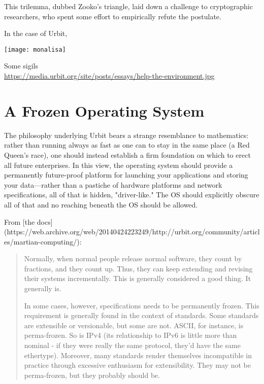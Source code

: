{{{This trilemma, dubbed Zooko's triangle, laid down a challenge to cryptographic researchers, who spent some effort to empirically refute the postulate.

In the case of Urbit,



\begin{marginfigure}[-5.5cm]
	\texttt{[image: monalisa]}
	\caption[Sigils]{Some sigils\\
	\url{https://media.urbit.org/site/posts/essays/help-the-environment.jpg}}
\end{marginfigure}

\section{A Frozen Operating System}

The philosophy underlying Urbit bears a strange resemblance to mathematics:  rather than running always as fast as one can to stay in the same place (a Red Queen's race), one should instead establish a firm foundation on which to erect all future enterprises.  In this view, the operating system should provide a permanently future-proof platform for launching your applications and storing your data—rather than a pastiche of hardware platforms and network specifications, all of that is hidden, "driver-like."  The OS should explicitly obscure all of that and no reaching beneath the OS should be allowed.

From [the docs](https://web.archive.org/web/20140424223249/http://urbit.org/community/articles/martian-computing/):

\begin{quote}
Normally, when normal people release normal software, they count by fractions, and they count up. Thus, they can keep extending and revising their systems incrementally. This is generally considered a good thing. It generally is.

In some cases, however, specifications needs to be permanently frozen. This requirement is generally found in the context of standards. Some standards are extensible or versionable, but some are not. ASCII, for instance, is perma-frozen. So is IPv4 (its relationship to IPv6 is little more than nominal - if they were really the same protocol, they'd have the same ethertype). Moreover, many standards render themselves incompatible in practice through excessive enthusiasm for extensibility. They may not be perma-frozen, but they probably should be.


\end{quote}}}}
